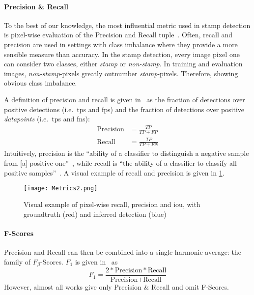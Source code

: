 \paragraph{Precision \& Recall}\label{par:precision-recall}
To the best of our knowledge, the most influential metric used in stamp 
detection is pixel-wise evaluation of the Precision and Recall
tuple~\cite{Nandedkar.2015b,Younas.2017,
Ahmed.2013,Dey.2015,
Micenkova.2011, Bhalgat.2016, Micenkova.2015,
Nandedkar.2015b}. Often, recall and precision are used in settings
with class imbalance where they provide a more sensible measure than accuracy.
In the stamp detection, every image pixel one can consider two classes, either
\textit{stamp} or \textit{non-stamp}. In training and evaluation images,
\textit{non-stamp}-pixels greatly outnumber \textit{stamp}-pixels. Therefore,
showing obvious class imbalance.
\par
A definition of precision and recall is given
in~\cite[423]{Goodfellow.2016} as the fraction of 
 detections over positive detections (i.e.\ \glspl{tp} and \glspl{fp}) and the
fraction of  detections over positive \textit{datapoints}
(i.e.\ \glspl{tp} and \glspl{fn}):
\begin{align}
    \text{Precision} &= \frac{TP}{TP + FP}\\
    \text{Recall} &= \frac{TP}{TP + FN}\label{eq:precision-recall}
\end{align}
Intuitively, precision is the ``ability of a classifier to distinguish a
negative sample from [a] positive one''~\cite{Younas.2017}, while
recall is ``the ability of a classifier to classify all positive samples''~\cite{Younas.2017}.
A visual example of recall and precision is given in
\cref{fig:visual-precision-recall}.
\begin{figure}
    \center
    \texttt{[image: Metrics2.png]}
    \caption[short={Visual example of pixel-wise recall, precision and \gls{iou}}]
    {Visual example of pixel-wise recall, precision and \gls{iou}, with
    groundtruth (red) and inferred detection (blue)}\label{fig:visual-precision-recall}
\end{figure}

\paragraph{F-Scores}\label{par:f-scores}
Precision and Recall can then be combined into a single harmonic average: the
family of \(F_\beta\)-Scores. \(F_1\) is given in~\cite[424]{Goodfellow.2016} as
\begin{equation*}
    F_1=\frac{2*\text{Precision}*\text{Recall}}{\text{Precision} + \text{Recall}}
\end{equation*}
However, almost all works give only Precision \& Recall and omit F-Scores.

